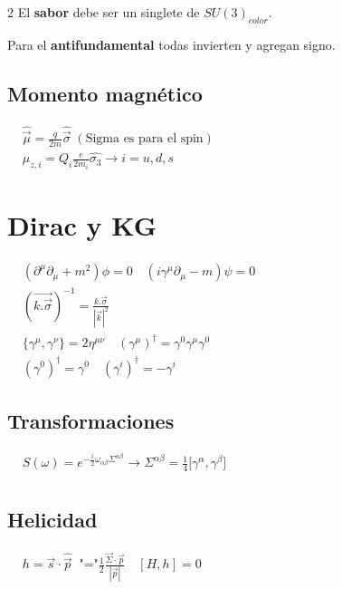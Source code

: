 \documentclass[a4, 12pt]{article}
\begin{document}
\begin{multicols}{2}
    \noindent El \textbf{sabor} debe ser un singlete de $SU(3)_{color}$.

    \noindent Para el \textbf{antifundamental} todas invierten y agregan signo.

    \subsection*{Momento magnético}
    $
    \begin{aligned}
        &\hat{\vec{\mu}} = \frac{q}{2m} \hat{\vec{\sigma}} \;(\text{Sigma es para el spin})\\
        &\hat{\mu}_{z,i} = Q_i \frac{e}{2m_i}\hat{\sigma_3} \rightarrow i = u,d,s
    \end{aligned}
    $

    \section*{Dirac y KG}
    $
    \begin{aligned}
        &(\partial^{\mu} \partial_{\mu} + m^2)\phi = 0 \quad
        (i \gamma^\mu \partial_{\mu} - m)\psi = 0 \\
        &(\vec{k . \vec{\sigma}})^{-1} = \frac{k . \vec{\sigma}}{|\vec{k}|^2} \\
        &\{\gamma^{\mu}, \gamma^{\nu}\} = 2\eta^{\mu \nu} \quad
        (\gamma^{\mu})^\dagger = \gamma^{0}\gamma^{\mu}\gamma^{0} \\
        &(\gamma^{0})^\dagger = \gamma^0 \quad
        (\gamma^{i})^\dagger = -\gamma^i
    \end{aligned}
    $

    \subsection*{Transformaciones}
    $
    \begin{aligned}
        &S(\omega) = e^{-\frac{i}{2} \omega_{\alpha \beta} \Sigma^{\alpha \beta}} \rightarrow
        \Sigma^{\alpha \beta} = \frac{1}{4} \big[\gamma^{\alpha}, \gamma^{\beta} \big] \\
    \end{aligned}
    $

    \subsection*{Helicidad}
    $
    \begin{aligned}
        &h = \vec{s} \cdot \hat{\vec{p}} \;\;\text{"="} \frac{1}{2} \frac{\vec{\Sigma} \cdot \vec{p}}{|\vec{p}|} \quad
        [H, h] = 0
    \end{aligned}
    $


\end{multicols}
\end{document}
